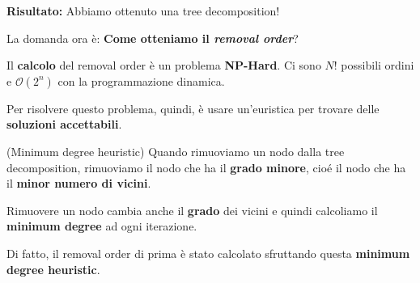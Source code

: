 \textbf{Risultato:} Abbiamo ottenuto una tree decomposition!

La domanda ora è: \textbf{Come otteniamo il \textit{removal order}}?

Il \textbf{calcolo} del removal order è un problema \textbf{NP-Hard}. Ci sono
$N!$ possibili ordini e $\mathcal{O}(2^n)$ con la programmazione dinamica.

Per risolvere questo problema, quindi, è usare un'euristica per trovare delle
\textbf{soluzioni accettabili}.

\begin{definition}(Minimum degree heuristic)
    Quando rimuoviamo un nodo dalla tree decomposition, rimuoviamo il nodo che ha il \textbf{grado minore}, cioé il nodo
    che ha il \textbf{minor numero di vicini}.

    Rimuovere un nodo cambia anche il \textbf{grado} dei vicini e quindi calcoliamo
    il \textbf{minimum degree} ad ogni iterazione.
\end{definition}

Di fatto, il removal order di prima è stato calcolato sfruttando questa
\textbf{minimum degree heuristic}. \newpage